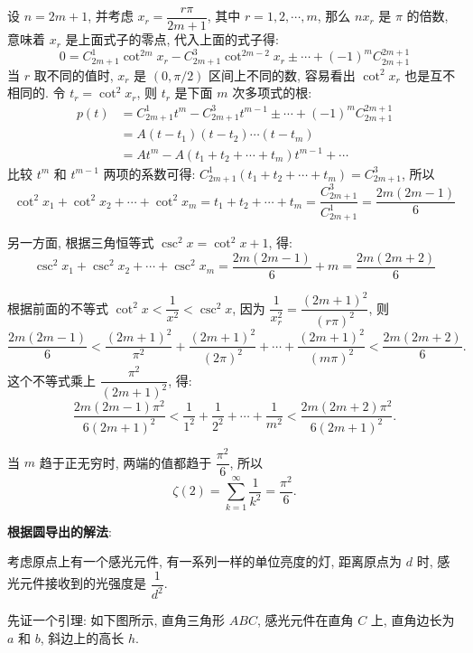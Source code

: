 设 $ n = 2m+1 $, 并考虑 $ x_r = \dfrac{r\pi}{2m+1} $, 其中 $ r = 1,2,\cdots,m $, 那么 $ nx_r $ 是 $ \pi $ 的倍数, 意味着 $ x_r $ 是上面式子的零点, 代入上面的式子得:
\[ 0 = C_{2m+1}^1\cot^{2m}x_r - C_{2m+1}^3\cot^{2m-2}x_r \pm\cdots + (-1)^m C_{2m+1}^{2m+1} \]
当 $ r $ 取不同的值时, $ x_r $ 是 $ (0, \pi/2) $ 区间上不同的数, 容易看出 $ \cot^2 x_r $ 也是互不相同的. 令 $ t_r = \cot^2 x_r $, 则 $ t_r $ 是下面 $ m $ 次多项式的根:
\begin{align*} 
p(t) &= C_{2m+1}^1t^m - C_{2m+1}^3t^{m-1} \pm\cdots + (-1)^m C_{2m+1}^{2m+1} \\
	&= A(t-t_1)(t-t_2)\cdots(t-t_m)\\
	&= At^m - A(t_1+t_2+\cdots+t_m)t^{m-1} + \cdots
\end{align*}
比较 $ t^m $ 和 $ t^{m-1} $ 两项的系数可得: $ C_{2m+1}^1(t_1+t_2+\cdots+t_m)=C_{2m+1}^3 $, 所以
\[ \cot^2x_1+\cot^2x_2+\cdots+\cot^2x_m=t_1+t_2+\cdots+t_m=\frac{C_{2m+1}^3}{C_{2m+1}^1}=\frac{2m(2m-1)}{6}\]

另一方面, 根据三角恒等式 $ \csc^2 x = \cot^2 x + 1 $, 得:
\[ \csc^2x_1+\csc^2x_2+\cdots+\csc^2x_m=\frac{2m(2m-1)}{6}+m = \frac{2m(2m+2)}{6} \]

根据前面的不等式 $ \cot^2x<\dfrac{1}{x^2}<\csc^2x $, 因为 $ \dfrac{1}{x_r^2} = \dfrac{(2m+1)^2}{(r\pi)^2} $, 则
\[ \frac{2m(2m-1)}{6} < \frac{(2m+1)^2}{\pi^2}+\frac{(2m+1)^2}{(2\pi)^2}+\cdots+\frac{(2m+1)^2}{(m\pi)^2} < \frac{2m(2m+2)}{6}. \]
这个不等式乘上 $ \dfrac{\pi^2}{(2m+1)^2} $, 得:
\[ \frac{2m(2m-1)\pi^2}{6(2m+1)^2} < \frac{1}{1^2}+\frac{1}{2^2}+\cdots+\frac{1}{m^2} < \frac{2m(2m+2)\pi^2}{6(2m+1)^2}. \]

当 $ m $ 趋于正无穷时, 两端的值都趋于 $ \dfrac{\pi^2}{6} $, 所以 
\[ \zeta(2)=\sum_{k=1}^{\infty}{\frac{1}{k^2}} =\frac{\pi^2}{6}. \]

\noindent\textbf{根据圆导出的解法}:

考虑原点上有一个感光元件, 有一系列一样的单位亮度的灯, 距离原点为 $ d $ 时, 感光元件接收到的光强度是 $ \dfrac{1}{d^2} $.

先证一个引理: 如下图所示, 直角三角形 $ ABC $, 感光元件在直角 $ C $ 上, 直角边长为 $ a $ 和 $ b $, 斜边上的高长 $ h $. 


